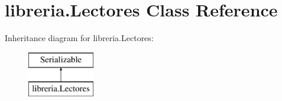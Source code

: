 \hypertarget{classlibreria_1_1_lectores}{}\section{libreria.\+Lectores Class Reference}
\label{classlibreria_1_1_lectores}
Inheritance diagram for libreria.\+Lectores\+:\begin{figure}[H]
\begin{center}
\leavevmode
\includegraphics[height=2.000000cm]{classlibreria_1_1_lectores}
\end{center}
\end{figure}
